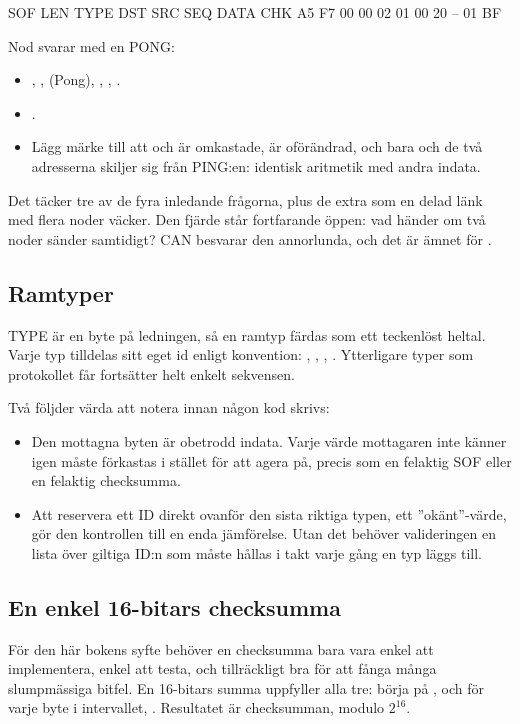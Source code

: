 \begin{textdrawing}
SOF      LEN   TYPE   DST   SRC   SEQ      DATA   CHK
A5 F7    00    00     02    01    00 20    --     01 BF
\end{textdrawing}

Nod  svarar med en PONG:
\begin{itemize}
  \item {}, ,  (Pong), ,
    , .
  \item {}.
  \item Lägg märke till att  och  är omkastade,  är oförändrad, och
    bara  och de två adresserna skiljer sig från PING:en: identisk aritmetik med andra
    indata.
\end{itemize}

Det täcker tre av de fyra inledande frågorna, plus de extra som en delad länk med flera noder
väcker. Den fjärde står fortfarande öppen: vad händer om två noder sänder samtidigt? CAN besvarar
den annorlunda, och det är ämnet för .

\subsection*{Ramtyper}
TYPE är en byte på ledningen, så en ramtyp färdas som ett teckenlöst heltal. Varje typ tilldelas
sitt eget id enligt konvention: , , ,
. Ytterligare typer som protokollet får fortsätter helt enkelt sekvensen.

Två följder värda att notera innan någon kod skrivs:
\begin{itemize}
  \item Den mottagna byten är obetrodd indata. Varje värde mottagaren inte känner igen måste
    förkastas i stället för att agera på, precis som en felaktig SOF eller en felaktig checksumma.
  \item Att reservera ett ID direkt ovanför den sista riktiga typen, ett ”okänt”-värde, gör den
    kontrollen till en enda jämförelse. Utan det behöver valideringen en lista över giltiga ID:n som
    måste hållas i takt varje gång en typ läggs till.
\end{itemize}

\subsection*{En enkel 16-bitars checksumma}
För den här bokens syfte behöver en checksumma bara vara enkel att implementera, enkel att testa,
och tillräckligt bra för att fånga många slumpmässiga bitfel. En 16-bitars summa uppfyller alla
tre: börja på , och för varje byte i intervallet, . Resultatet är
checksumman, modulo $2^{16}$.

